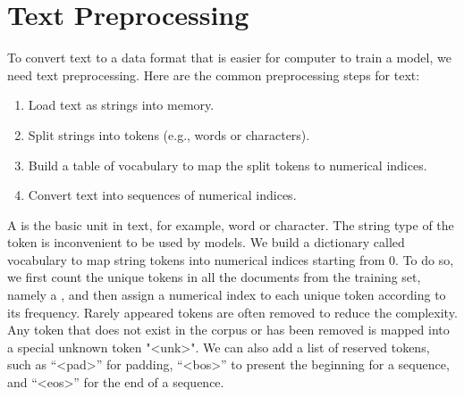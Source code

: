 
\chapter{Text Preprocessing}
\label{cha:text-preprocessing}

To convert text to a data format that is easier for computer to train a model, we need text preprocessing.
Here are the common preprocessing steps for text:
\begin{enumerate}
\item Load text as strings into memory.
\item Split strings into tokens (e.g., words or characters).
\item Build a table of vocabulary to map the split tokens to numerical indices.
\item Convert text into sequences of numerical indices.
\end{enumerate}


A  is the basic unit in text, for example, word or character.
The string type of the token is inconvenient to be used by models.
We build a dictionary called vocabulary to map string tokens into numerical indices starting from 0.
To do so, we first count the unique tokens in all the documents from the training set, namely a , and then assign a numerical index to each unique token according to its frequency.
Rarely appeared tokens are often removed to reduce the complexity.
Any token that does not exist in the corpus or has been removed is mapped into a special unknown token "<unk>".
We can also add a list of reserved tokens, such as “<pad>” for padding, “<bos>” to present the beginning for a sequence, and “<eos>” for the end of a sequence.




